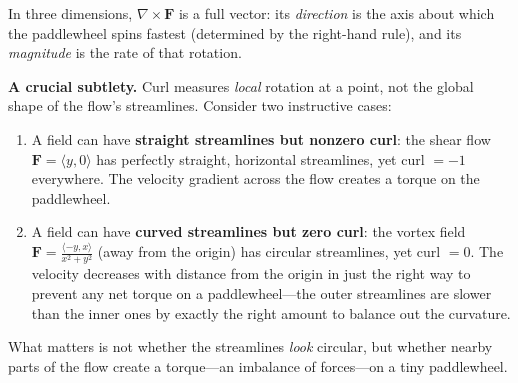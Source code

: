 \noindent In three dimensions, $\nabla \times \mathbf{F}$ is a full vector: its \textit{direction} is the axis about which the paddlewheel spins fastest (determined by the right-hand rule), and its \textit{magnitude} is the rate of that rotation.

\medskip

\noindent \textbf{A crucial subtlety.} Curl measures \textit{local} rotation at a point, not the global shape of the flow's streamlines. Consider two instructive cases:
\begin{enumerate}
    \item A field can have \textbf{straight streamlines but nonzero curl}: the shear flow $\mathbf{F} = \langle y, 0 \rangle$ has perfectly straight, horizontal streamlines, yet curl $= -1$ everywhere. The velocity gradient across the flow creates a torque on the paddlewheel.
    \item A field can have \textbf{curved streamlines but zero curl}: the vortex field $\mathbf{F} = \frac{\langle -y, x \rangle}{x^2 + y^2}$ (away from the origin) has circular streamlines, yet curl $= 0$. The velocity decreases with distance from the origin in just the right way to prevent any net torque on a paddlewheel---the outer streamlines are slower than the inner ones by exactly the right amount to balance out the curvature.
\end{enumerate}

\noindent What matters is not whether the streamlines \textit{look} circular, but whether nearby parts of the flow create a torque---an imbalance of forces---on a tiny paddlewheel.

